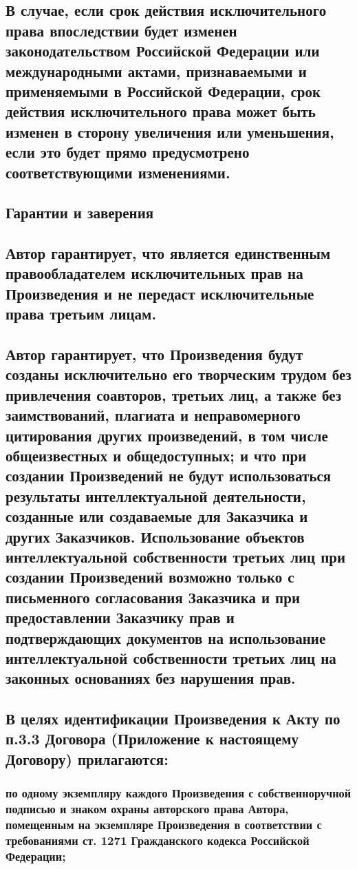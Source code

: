 \documentclass[12pt]{article}
\begin{document}
\subsection{В случае, если срок действия исключительного права впоследствии будет изменен законодательством Российской Федерации или международными актами, признаваемыми и применяемыми в Российской Федерации, срок действия исключительного права может быть изменен в сторону увеличения или уменьшения, если это будет прямо предусмотрено соответствующими изменениями.}

\subsection*{\bf Гарантии и заверения}

\subsection{Автор гарантирует, что является единственным правообладателем исключительных прав на Произведения и не передаст исключительные права третьим лицам.}

\subsection{Автор гарантирует, что Произведения будут созданы исключительно его творческим трудом без привлечения соавторов, третьих лиц, а также без заимствований, плагиата и неправомерного цитирования других произведений, в том числе общеизвестных и общедоступных; и что при создании Произведений не будут использоваться результаты интеллектуальной деятельности, созданные или создаваемые для Заказчика и других Заказчиков. Использование объектов интеллектуальной собственности третьих лиц при создании Произведений возможно только с письменного согласования Заказчика и при предоставлении Заказчику прав и подтверждающих документов на использование интеллектуальной собственности третьих лиц на законных основаниях без нарушения прав.}

\subsection{В целях идентификации Произведения к Акту по п.3.3 Договора (Приложение  к настоящему Договору) прилагаются:}

\subsubsection{по одному экземпляру каждого Произведения с собственноручной подписью и знаком охраны авторского права Автора, помещенным на экземпляре Произведения в соответствии с требованиями ст. 1271 Гражданского кодекса Российской Федерации;}
\end{document}
